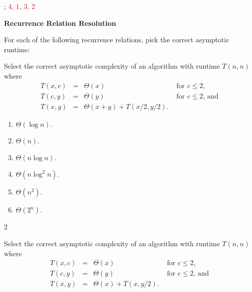 \documentclass[12pt,twoside]{article}
\begin{document}
\begin{problems}
\begin{problemparts}
        \ifsolution \solution{}
            \sout{}; \textcolor{red}{4, 1, 3, 2}
        \fi

    \end{problemparts}

    \problem {} \textbf{Recurrence Relation Resolution}

    For each of the following recurrence relations, pick the correct asymptotic
    runtime:

    \begin{problemparts}

        \problempart {}
        Select the correct asymptotic complexity
        of an algorithm with runtime $T(n, n)$
        where 
        $$
            \begin{array}{rcll}
                T(x, c) & = & \Theta(x)                         & \textrm{ for $c \le 2$},     \\
                T(c, y) & = & \Theta(y)                         & \textrm{ for $c \le 2$, and} \\
                T(x, y) & = & \Theta(x + y) + T(x / 2, y / 2).
            \end{array}
        $$

        \begin{enumerate}
            \item $\Theta(\log n)$.
            \item $\Theta(n)$.
            \item $\Theta(n \log n)$.
            \item $\Theta(n \log^2 n)$.
            \item $\Theta(n^2)$.
            \item $\Theta(2^n)$.
        \end{enumerate}

        \ifsolution \solution{}
            2
        \fi

        \problempart {}
        Select the correct asymptotic complexity
        of an algorithm with runtime $T(n, n)$
        where 
        $$
            \begin{array}{rcll}
                T(x, c) & = & \Theta(x)                 & \textrm{ for $c \le 2$},     \\
                T(c, y) & = & \Theta(y)                 & \textrm{ for $c \le 2$, and} \\
                T(x, y) & = & \Theta(x) + T(x, y / 2).
            \end{array}
        $$


\end{problemparts}
\end{problems}
\end{document}
